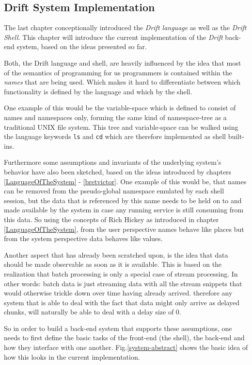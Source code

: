 \subsection{Drift System Implementation}
\label{driftimplementation}

The last chapter conceptionally introduced the \textit{Drift language}
as well as the \textit{Drift Shell}. This chapter will introduce
the current implementation of the \textit{Drift} back-end system,
based on the ideas presented so far.

Both, the Drift language and shell, are heavily influenced
by the idea that most of the semantics of programming for us
programmers is contained within the \textit{names} that are being
used. Which makes it hard to differentiate between which
functionality is defined by the language and which by the shell.

One example of this would be the variable-space which is
defined to consist of names and namespaces only, forming the same
kind of namespace-tree as a traditional UNIX file system.
This tree and variable-space can be walked using the language
keywords \texttt{ls} and \texttt{cd} which are therefore implemented
as shell built-ins.

Furthermore some assumptions and invariants of the underlying
system's behavior have also been sketched, based on the ideas
introduced by chapters \ref{LanguageOfTheSystem} - \ref{bretvictor}.
One example of this would be, that names can be removed from
the pseudo-global namespace emulated by each shell session,
but the data that is referenced by this name needs to be
held on to and made available by the system in case any
running service is still consuming from this data.
So using the concepts of Rich Hickey as introduced in
chapter \ref{LanguageOfTheSystem}, from the user perspective
names behave like places but from the system perspective
data behaves like values.

Another aspect that has already been scratched upon, is the
idea that data should be made observable as soon as it is
available. This is based on the realization that batch
processing is only a special case of stream processing.
In other words: batch data is just streaming data with all
the stream snippets that would otherwise trickle down
over time having already arrived. therefore any system that
is able to deal with the fact that data might only arrive
as delayed chunks, will naturally be able to deal with a
delay size of 0.

So in order to build a back-end system that supports these
assumptions, one needs to first define the basic tasks of
the front-end (the shell), the back-end and how they interface
with one another. Fig.\ref{system-abstract} shows the
basic idea of how this looks in the current implementation.

